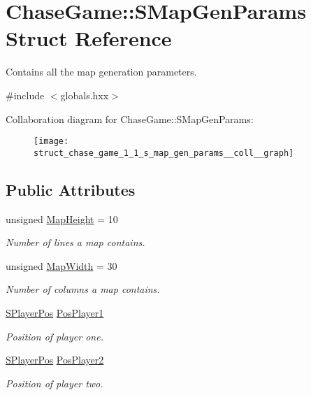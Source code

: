 \hypertarget{struct_chase_game_1_1_s_map_gen_params}{\section{Chase\-Game\-:\-:S\-Map\-Gen\-Params Struct Reference}
\label{struct_chase_game_1_1_s_map_gen_params}
}


Contains all the map generation parameters.  




{\ttfamily \#include $<$globals.\-hxx$>$}



Collaboration diagram for Chase\-Game\-:\-:S\-Map\-Gen\-Params\-:\nopagebreak
\begin{figure}[H]
\begin{center}
\leavevmode
\texttt{[image: struct\_chase\_game\_1\_1\_s\_map\_gen\_params\_\_coll\_\_graph]}
\end{center}
\end{figure}
\subsection*{Public Attributes}
\begin{DoxyCompactItemize}
\item 
unsigned \hyperlink{struct_chase_game_1_1_s_map_gen_params_a772c51dab66176dfe733e4e20cbf85d4}{Map\-Height} = 10
\begin{DoxyCompactList}\small\item\em Number of lines a map contains. \end{DoxyCompactList}\item 
unsigned \hyperlink{struct_chase_game_1_1_s_map_gen_params_a0897aeaa1a1a3a66697a6b441ca8c2de}{Map\-Width} = 30
\begin{DoxyCompactList}\small\item\em Number of columns a map contains. \end{DoxyCompactList}\item 
\hyperlink{struct_chase_game_1_1_s_player_pos}{S\-Player\-Pos} \hyperlink{struct_chase_game_1_1_s_map_gen_params_a8db28a9ee45a200d67b20fc803645501}{Pos\-Player1}
\begin{DoxyCompactList}\small\item\em Position of player one. \end{DoxyCompactList}\item 
\hyperlink{struct_chase_game_1_1_s_player_pos}{S\-Player\-Pos} \hyperlink{struct_chase_game_1_1_s_map_gen_params_afd0a0d4b22e228d547af88d38b6ae963}{Pos\-Player2}
\begin{DoxyCompactList}\small\item\em Position of player two. \end{DoxyCompactList}\end{DoxyCompactItemize}


